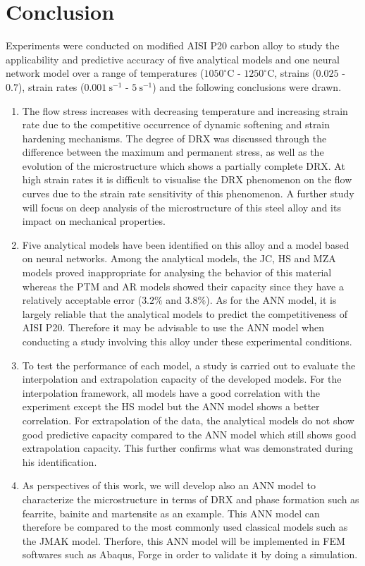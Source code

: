 \documentclass[twoside,english,1p,final,sort&compress]{elsarticle}
\theoremstyle{plain}
\begin{document}
\section{Conclusion \label{sec:Conclusion}}
Experiments were conducted on modified AISI P20 carbon alloy to study the applicability and predictive accuracy of five analytical models and one neural network model over a range of temperatures ($1050^\circ$C - $1250^\circ$C, strains ($0.025$ - $0.7$), strain rates ($0.001\ \text{s}^{-1}$ - $5\ \text{s}^{-1}$) and the following conclusions were drawn.
\begin{enumerate}
\item The flow stress increases with decreasing temperature and increasing strain rate due to the competitive occurrence of dynamic softening and strain hardening mechanisms.  The degree of DRX was discussed through the difference between the maximum and permanent stress, as well as the evolution of the microstructure which shows a partially complete DRX. At high strain rates it is difficult to visualise the DRX phenomenon on the flow curves due to the strain rate sensitivity of this phenomenon. A further study will focus on deep analysis of the microstructure of this steel alloy and its impact on mechanical properties.
\item Five analytical models have been identified on this alloy and a model based on neural networks. Among the analytical models, the JC, HS and MZA models proved inappropriate for analysing the behavior of this material whereas the PTM and AR models showed their capacity since they have a relatively acceptable error ($ 3.2 \% $ and $ 3.8 \%$). As for the ANN model, it is largely reliable that the analytical models to predict the competitiveness of AISI P20. Therefore it may be advisable to use the ANN model when conducting a study involving this alloy under these experimental conditions.
\item To test the performance of each model, a study is carried out to evaluate the interpolation and extrapolation capacity of the developed models. For the interpolation framework, all models have a good correlation with the experiment except the HS model but the ANN model shows a better correlation.  For extrapolation of the data, the analytical models do not show good predictive capacity compared to the ANN model which still shows good extrapolation capacity. This further confirms what was demonstrated during his identification.
\item As perspectives of this work, we will develop also an ANN model to characterize the microstructure in terms of DRX and phase formation such as fearrite, bainite and martensite as an example. This ANN model can therefore be compared to the most commonly used classical models such as the JMAK model. Therfore, this ANN model  will be implemented in FEM softwares such as Abaqus, Forge in order to validate it by doing a simulation.
\end{enumerate}


\end{document}
